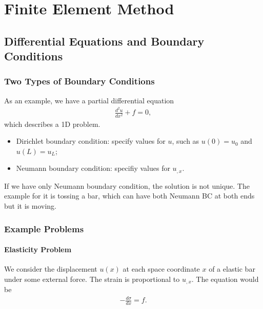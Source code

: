 \documentclass[letterpaper,12pt,english]{sphinxmanual}
\begin{document}
\chapter{Finite Element Method}
\label{\detokenize{finite-element-method/index::doc}}\label{\detokenize{finite-element-method/index:finite-element-method}}

\section{Differential Equations and Boundary Conditions}
\label{\detokenize{finite-element-method/pde-and-boundary-conditions::doc}}\label{\detokenize{finite-element-method/pde-and-boundary-conditions:differential-equations-and-boundary-conditions}}

\subsection{Two Types of Boundary Conditions}
\label{\detokenize{finite-element-method/pde-and-boundary-conditions:two-types-of-boundary-conditions}}
As an example, we have a partial differential equation
\begin{equation*}
\begin{split}\frac{d^2u}{dx^2} + f = 0,\end{split}
\end{equation*}
which describes a 1D problem.
\begin{itemize}
\item {} 
Dirichlet boundary condition: specify values for \(u\), such as \(u(0)=u_0\) and \(u(L)=u_L\);

\item {} 
Neumann boundary condition: specifiy values for \(u_{,x}\).

\end{itemize}

If we have only Neumann boundary condition, the solution is not unique. The example for it is tossing a bar, which can have both Neumann BC at both ends but it is moving.


\subsection{Example Problems}
\label{\detokenize{finite-element-method/pde-and-boundary-conditions:example-problems}}

\subsubsection{Elasticity Problem}
\label{\detokenize{finite-element-method/pde-and-boundary-conditions:elasticity-problem}}
We consider the displacement \(u(x)\) at each space coordinate \(x\) of a elastic bar under some external force. The strain is proportional to \(u_{,x}\). The equation would be
\begin{equation*}
\begin{split}-\frac{d\sigma}{dx} = f.\end{split}
\end{equation*}
\end{document}
